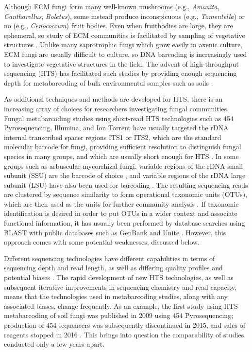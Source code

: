 \documentclass[
  12pt,
]{article}
\begin{document}
Although ECM fungi form many well-known mushrooms (e.g., \emph{Amanita}, \emph{Cantharellus}, \emph{Boletus}), some instead produce inconspicuous (e.g., \emph{Tomentella}) or no (e.g., \emph{Cenococcum}) fruit bodies.
Even when fruitbodies are large, they are ephemeral, so study of ECM communities is facilitated by sampling of vegetative structures \autocite{horton2001}.
Unlike many saprotrophic fungi which grow easily in axenic culture, ECM fungi are usually difficult to culture, so DNA barcoding is increasingly used to investigate vegetative structures in the field.
The advent of high-throughput sequencing (HTS) has facilitated such studies by providing enough sequencing depth for metabarcoding of bulk environmental samples such as soils \autocite{Lindahl2013}.

As additional techniques and methods are developed for HTS, there is an increasing array of choices for researchers investigating fungal communities.
Fungal metabarcoding studies using short-read HTS technologies such as 454 Pyrosequencing, Illumina, and Ion Torrent
have usually targeted the rDNA internal transcribed spacer regions ITS1 or ITS2,
which are the standard molecular barcode for fungi, providing sufficient resolution to distinguish fungal species in many groups, and which are usually short enough for HTS \autocite{schoch2012,Lindahl2013}.
In some groups such as arbuscular mycorrhizal fungi, variable regions of the rDNA small subunit (SSU) are the barcode of choice \autocite{opik2010}, and variable regions of the rDNA large subunit (LSU) have also been used for barcoding \autocite{house2016,tedersoo2015}.
The resulting sequencing reads are clustered by sequence similarity to form operational taxonomic units (OTUs), which are then used as the units for further community analysis \autocite{Lindahl2013}.
If taxonomic identification is desired in order to put OTUs in a wider context and associate functional information, it has usually been performed by database searches using BLAST \autocite{altschul1990,Lindahl2013} with public databases such as GenBank \autocite{benson2013} and Unite \autocite{nilsson2019a}.
However, this approach comes with some potential weaknesses, discussed below.

Different sequencing technologies have different capabilities in terms of sequencing depth and read length, as well as differing quality profiles and potential biases \autocite{yang2013}.
The rapid development of new HTS technologies, as well as subsequent iterative improvements in sequencing chemistry and read capacity, means that the technologies used in metabarcoding studies, along with any associated biases, change frequently.
As an example, the first study using HTS metabarcoding of soil fungi was published in 2009 \autocite{buee2009} using 454 Pyrosequencing; production of 454 sequencers was subsequently discontinued in 2015, and sales of reagents stopped in 2016 \autocite{hollmer2013}.
This brings into question the comparability of studies conducted only a few years apart.
\end{document}
